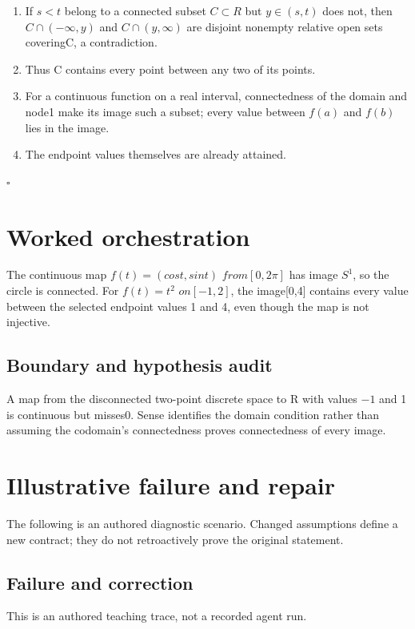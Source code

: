\documentclass[preprint,12pt,aps,pra,showkeys,amsmath,amssymb,superscriptaddress,floatfix]{revtex4-2}
\theoremstyle{definition}
\theoremstyle{remark}
\begin{document}
\begin{enumerate}
\def\labelenumi{\arabic{enumi}.}
\item
  If \(s<t\) belong to a connected subset \(C\subset R\) but
  \(y\in (s,t)\) does not, then \(C\cap (-\infty ,y)\) and
  \(C\cap (y,\infty )\) are disjoint nonempty relative open sets
  coveringC, a contradiction.
\item
  Thus C contains every point between any two of its points.
\item
  For a continuous function on a real interval, connectedness of the
  domain and node1 make its image such a subset; every value between
  \(f(a)\) and \(f(b)\) lies in the image.
\item
  The endpoint values themselves are already attained.
\end{enumerate}

\hfill$\square$

\section{Worked orchestration}

The continuous map \(f(t)=(cost,sint)\) \(from[0,2\pi ]\) has image
\(S^{1}\), so the circle is connected. For \(f(t)=t^{2}\) \(on[-1,2]\),
the image{[}0,4{]} contains every value between the selected endpoint
values 1 and 4, even though the map is not injective.

\subsection{Boundary and hypothesis audit}

A map from the disconnected two-point discrete space to R with values
\(-1\) and 1 is continuous but misses0. Sense identifies the domain
condition rather than assuming the codomain's connectedness proves
connectedness of every image.

\section{Illustrative failure and repair}

The following is an authored diagnostic scenario. Changed assumptions
define a new contract; they do not retroactively prove the original
statement.

\subsection{Failure and correction}
This is an authored teaching trace, not a recorded agent run.
\end{document}
